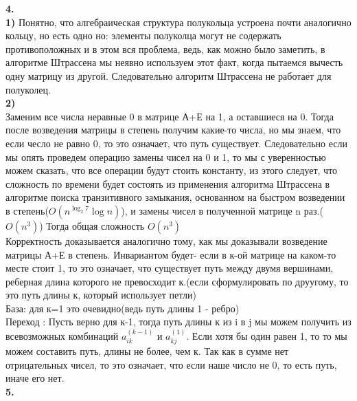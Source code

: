 \documentclass[a4paper,12pt]{article}
\begin{document}
\textbf{4.}\\
\textbf{1)} Понятно, что алгебраическая структура полукольца устроена почти аналогично кольцу, но есть одно но: элементы полуколца могут не содержать противоположных и в этом вся проблема, ведь, как можно было заметить, в алгоритме Штрассена мы неявно используем этот факт, когда пытаемся вычесть одну матрицу из другой. Следовательно алгоритм Штрассена не работает для полуколец.\\
\textbf{2)}\\
Заменим все числа неравные 0 в матрице А+Е на 1, а оставшиеся на 0. Тогда после возведения матрицы в степень получим какие-то числа, но мы знаем, что если чесло не равно 0, то это означает, что путь существует. Следовательно если мы опять проведем операцию замены чисел на 0 и 1, то мы с уверенностью можем сказать, что все операции будут стоить константу, из этого следует, что сложность по времени будет состоять из применения алгоритма Штрассена в алгоритме поиска транзитивного замыкания, основанном на быстром возведении в степень($O(n^{\log_2 7} \log n)$), и замены чисел в полученной матрице n раз.($O(n^3)$) Тогда общая сложность $O(n^3)$\\
Корректность доказывается аналогично тому, как мы доказывали возведение матрицы А+Е в степень. Инвариантом будет- если в к-ой матрице на каком-то месте стоит 1, то это означает, что существует путь между двумя вершинами, реберная длина которого не превосходит к.(если сформулировать по друугому, то это путь длины к, который использует петли) \\
База: для к=1 это очевидно(ведь путь длины 1 - ребро)\\
Переход : Пусть верно для к-1, тогда путь длины к из i в j мы можем получить из всевозможных комбинаций $a^{(k-1)}_{ik}$ и $a^{(1)}_{kj}$. Если хотя бы один равен 1, то то мы можем составить путь, длины не более, чем к. Так как в сумме нет отрицательных чисел, то это означает, что если наше число не 0, то есть путь, иначе его нет.\\

\textbf{5.}\\
\end{document}
